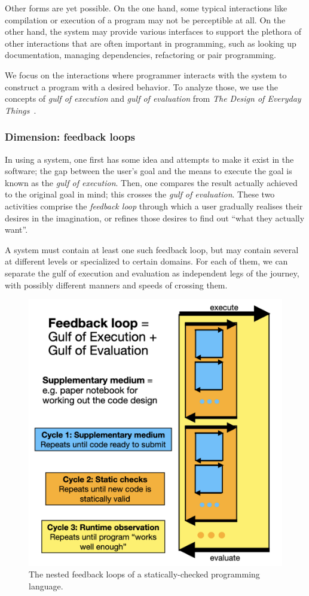 \documentclass[english,submission]{programming}
\begin{document}
Other forms are yet possible. On the one hand, some typical interactions
like compilation or execution of a program may not be perceptible at
all. On the other hand, the system may provide various interfaces to
support the plethora of other interactions that are often important in
programming, such as looking up documentation, managing dependencies,
refactoring or pair programming.

We focus on the interactions where programmer interacts with the system
to construct a program with a desired behavior. To analyze those, we use
the concepts of \emph{gulf of execution} and \emph{gulf of evaluation}
from \emph{The Design of Everyday Things}~\cite{Norman}.

\hypertarget{dimension-feedback-loops}{%
\subsubsection{Dimension: feedback
loops}\label{dimension-feedback-loops}}

In using a system, one first has some idea and attempts to make it exist
in the software; the gap between the user's goal and the means to
execute the goal is known as the \emph{gulf of execution}. Then, one
compares the result actually achieved to the original goal in mind; this
crosses the \emph{gulf of evaluation}. These two activities comprise the
\emph{feedback loop} through which a user gradually realises their
desires in the imagination, or refines those desires to find out ``what
they actually want''.

A system must contain at least one such feedback loop, but may contain
several at different levels or specialized to certain domains. For each
of them, we can separate the gulf of execution and evaluation as
independent legs of the journey, with possibly different manners and
speeds of crossing them.

\begin{figure}
  \centering
  \includegraphics[width=0.5\linewidth]{feedback-loops.png}
  \caption{The nested feedback loops of a statically-checked programming language.\label{fig:feedback-loops}}
\end{figure}
\end{document}
